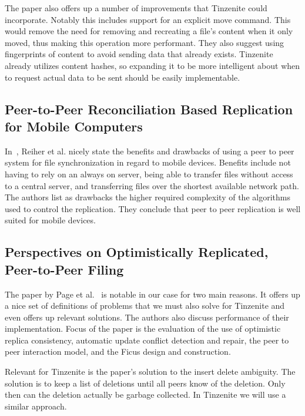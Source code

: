 The paper also offers up a number of improvements that Tinzenite could incorporate.
Notably this includes support for an explicit move command.
This would remove the need for removing and recreating a file's content when it only moved, thus making this operation more performant.%
They also suggest using fingerprints of content to avoid sending data that already exists.
Tinzenite already utilizes content hashes, so expanding it to be more intelligent about when to request actual data to be sent should be easily implementable.

\subsection{Peer-to-Peer Reconciliation Based Replication for Mobile Computers}
\label{sub:Peer-to-Peer Reconciliation Based Replication for Mobile Computers}

In~\cite{reiher1996peer}, Reiher et al. nicely state the benefits and drawbacks of using a peer to peer system for file synchronization in regard to mobile devices.
Benefits include not having to rely on an always on server, being able to transfer files without access to a central server, and transferring files over the shortest available network path.
The authors list as drawbacks the higher required complexity of the algorithms used to control the replication.
They conclude that peer to peer replication is well suited for mobile devices.

\subsection{Perspectives on Optimistically Replicated, Peer-to-Peer Filing}
\label{sub:Perspectives on Optimistically Replicated, Peer-to-Peer Filing}

The paper by Page et al.~\cite{page1998perspectives} is notable in our case for two main reasons.
It offers up a nice set of definitions of problems that we must also solve for Tinzenite and even offers up relevant solutions.
The authors also discuss performance of their implementation.
Focus of the paper is the evaluation of the use of optimistic replica consistency, automatic update conflict detection and repair, the peer to peer interaction model, and the Ficus design and construction.

Relevant for Tinzenite is the paper's solution to the insert delete ambiguity.
The solution is to keep a list of deletions until all peers know of the deletion.
Only then can the deletion actually be garbage collected.
In Tinzenite we will use a similar approach.

